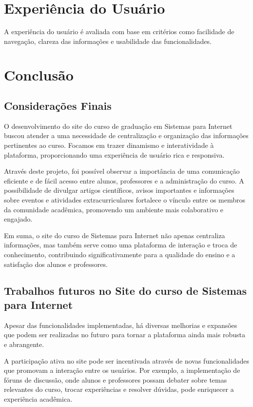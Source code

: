 \documentclass[a4paper,12pt]{report}
\begin{document}
\chapter{Experiência do Usuário}
A experiência do usuário é avaliada com base em critérios como facilidade de navegação, clareza das informações e usabilidade das funcionalidades.

\chapter{Conclusão} 

\section{Considerações Finais} 

O desenvolvimento do site do curso de graduação em Sistemas para Internet buscou atender a uma necessidade de centralização e organização das informações pertinentes ao curso. Focamos em trazer dinamismo e interatividade à plataforma, proporcionando uma experiência de usuário rica e responsiva. 

Através deste projeto, foi possível observar a importância de uma comunicação eficiente e de fácil acesso entre alunos, professores e a administração do curso. A possibilidade de divulgar artigos científicos, avisos importantes e informações sobre eventos e atividades extracurriculares fortalece o vínculo entre os membros da comunidade acadêmica, promovendo um ambiente mais colaborativo e engajado. 

Em suma, o site do curso de Sistemas para Internet não apenas centraliza informações, mas também serve como uma plataforma de interação e troca de conhecimento, contribuindo significativamente para a qualidade do ensino e a satisfação dos alunos e professores.

\section{Trabalhos futuros no Site do curso de Sistemas para Internet} 

Apesar das funcionalidades implementadas, há diversas melhorias e expansões que podem ser realizadas no futuro para tornar a plataforma ainda mais robusta e abrangente. 

A participação ativa no site pode ser incentivada através de novas funcionalidades que promovam a interação entre os usuários. Por exemplo, a implementação de fóruns de discussão, onde alunos e professores possam debater sobre temas relevantes do curso, trocar experiências e resolver dúvidas, pode enriquecer a experiência acadêmica.  
\end{document}

